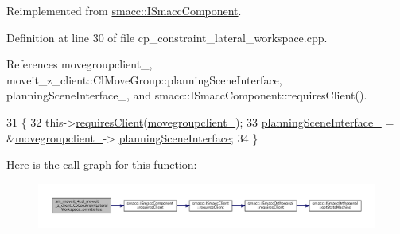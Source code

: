 Reimplemented from \hyperlink{classsmacc_1_1ISmaccComponent_ae6f71d008db12553912e9436184b9e65}{smacc\+::\+I\+Smacc\+Component}.



Definition at line 30 of file cp\+\_\+constraint\+\_\+lateral\+\_\+workspace.\+cpp.



References movegroupclient\+\_\+, moveit\+\_\+z\+\_\+client\+::\+Cl\+Move\+Group\+::planning\+Scene\+Interface, planning\+Scene\+Interface\+\_\+, and smacc\+::\+I\+Smacc\+Component\+::requires\+Client().


\begin{DoxyCode}
31         \{
32             this->\hyperlink{classsmacc_1_1ISmaccComponent_a36c085d906fbae0fcaee817aaeafebf4}{requiresClient}(\hyperlink{classsm__moveit__4_1_1cl__moveit__z__client_1_1CpConstraintLateralWorkspace_ac8161c83393d63fbf382856ac1aacb93}{movegroupclient\_});
33             \hyperlink{classsm__moveit__4_1_1cl__moveit__z__client_1_1CpConstraintLateralWorkspace_a39ac03e23023aef4e90f6bdd2ea41f75}{planningSceneInterface\_} = &\hyperlink{classsm__moveit__4_1_1cl__moveit__z__client_1_1CpConstraintLateralWorkspace_ac8161c83393d63fbf382856ac1aacb93}{movegroupclient\_}->
      \hyperlink{classmoveit__z__client_1_1ClMoveGroup_a21c879b2683286aa21ce68f40195b4b5}{planningSceneInterface};
34         \}
\end{DoxyCode}
Here is the call graph for this function\+:
\nopagebreak
\begin{figure}[H]
\begin{center}
\leavevmode
\includegraphics[width=350pt]{classsm__moveit__4_1_1cl__moveit__z__client_1_1CpConstraintLateralWorkspace_a78085a604bdc75b6678825580a79b304_cgraph}
\end{center}
\end{figure}
\mbox{\label{classsm__moveit__4_1_1cl__moveit__z__client_1_1CpConstraintLateralWorkspace_a1b96546a90ecd3ce10a73b65ff5fcf35}} 
